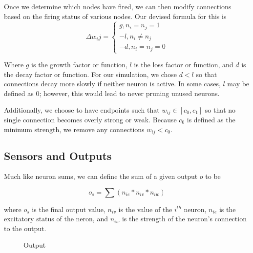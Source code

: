 \documentclass[12pt]{article}
\begin{document}
Once we determine which nodes have fired, we can then modify connections based on the firing status of various nodes.  Our devised formula for this is
$$
\Delta w_ij =
\begin{cases}
g, n_i = n_j = 1\\
-l, n_i \neq n_j\\
-d, n_i = n_j = 0
\end{cases}
$$

Where $g$ is the growth factor or function, $l$ is the loss factor or function, and $d$ is the decay factor or function.  For our simulation, we chose $d < l$ so that connections decay more slowly if neither neuron is active.  In some cases, $l$ may be defined as 0; however, this would lead to never pruning unused neurons.

Additionally, we choose to have endpoints such that $w_{ij} \in [c_0, c_1]$ so that no single connection becomes overly strong or weak.  Because $c_0$ is defined as the minimum strength, we remove any connections $w_{ij} < c_0$.

\subsection{Sensors and Outputs}

Much like neuron sums, we can define the sum of a given output $o$ to be

$$
o_s = \sum (n_{ie} * n_{iv} * n_{iw})
$$

where $o_s$ is the final output value,  $n_{iv}$ is the value of the $i^{th}$ neuron, $n_{ie}$ is the excitatory status of the neron, and $n_{iw}$ is the strength of the neuron's connection to the output.

\begin{figure}[H]
    \centering
    \caption{Output} \label{fig:Output}
\end{figure}
\end{document}
